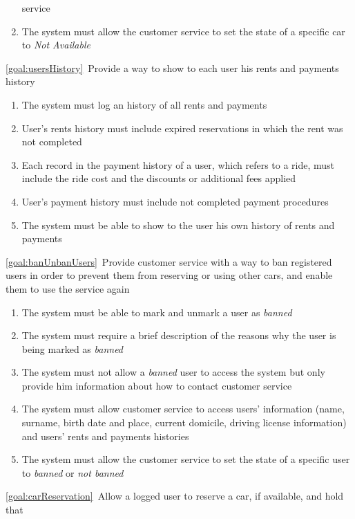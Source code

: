 \begin{description}
\begin{enumerate}[resume*]
  			service
   			\item The system must allow the customer service to set the state of a
   			specific car to \emph{Not Available}	
  		\end{enumerate}
  		\item \ref{goal:usersHistory}\ Provide a way to show to each user his rents and payments history
  			\begin{enumerate}[resume*] 
  				\item The system must log an history of all rents and payments
  				\item User's rents history must include expired reservations in which the rent was not completed
  				\item Each record in the payment history of a user, which refers to a ride, must include the ride cost and 
  				the discounts or additional fees applied
  				\item User's payment history must include not completed payment procedures
  				\item The system must be able to show to the user his own history of rents and
  				payments
  			\end{enumerate}
  		\item \ref{goal:banUnbanUsers}\ Provide customer service with a way to ban registered users in order to prevent them from reserving or using other cars, and enable them to use the service again
  			\begin{enumerate}[resume*]
  				\item The system must be able to mark and unmark a user as \emph{banned} 
  				\item The system must require a brief description of the reasons why the user is being
  				marked as \emph{banned}
  				\item The system must not allow a \emph{banned} user to access the system but only
  				provide him information about how to contact customer service 
  				\item The system must allow customer service to access users' information (name,
  				surname, birth date and place, current domicile, driving license information) and
  				users' rents and payments histories
   				\item The system must allow the customer service to set the state of a
   				specific user to \emph{banned} or \emph{not banned}
   			\end{enumerate}
 	  	\item \ref{goal:carReservation}\ Allow a logged user to reserve a car, if available, and hold that

\end{description}
